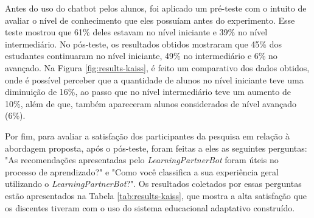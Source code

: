 Antes do uso do chatbot pelos alunos, foi aplicado um pré-teste com o intuito de avaliar o nível de conhecimento que eles possuíam antes do experimento. Esse teste mostrou que 61\% deles estavam no nível iniciante e 39\% no nível intermediário. No pós-teste, os resultados obtidos mostraram que 45\% dos estudantes continuaram no nível iniciante, 49\% no intermediário e 6\% no avançado. Na Figura \ref{fig:results-kaiss}, é feito um comparativo dos dados obtidos, onde é possível perceber que a quantidade de alunos no nível iniciante teve uma diminuição de 16\%, ao passo que no nível intermediário teve um aumento de 10\%, além de que, também apareceram alunos considerados de nível avançado (6\%).

\begin{figure}[ht] 
   	\captionsetup{width=16cm}
\end{figure}

Por fim, para avaliar a satisfação dos participantes da pesquisa em relação à abordagem proposta, após o pós-teste, foram feitas a eles as seguintes perguntas: "As recomendações apresentadas pelo \textit{LearningPartnerBot} foram úteis no processo de aprendizado?" e "Como você classifica a sua experiência geral utilizando o \textit{LearningPartnerBot}?". Os resultados coletados por essas perguntas estão apresentados na Tabela \ref{tab:results-kaiss}, que mostra a alta satisfação que os discentes tiveram com o uso do sistema educacional adaptativo construído.

\begin{table}[ht]
	\captionsetup{width=13cm}
\end{table}